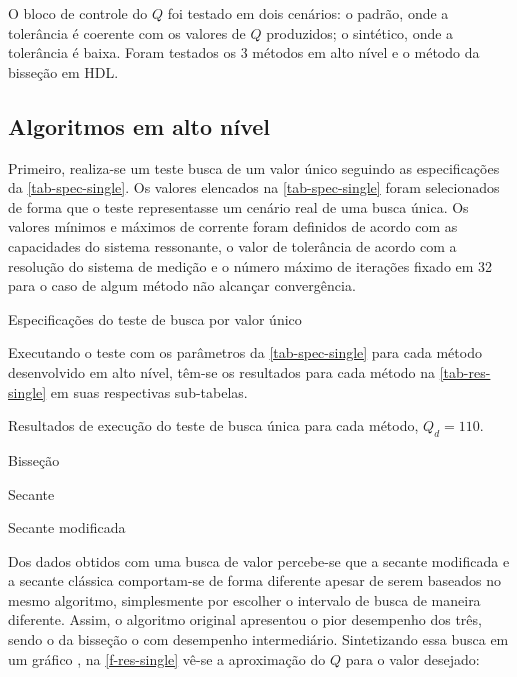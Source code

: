 O bloco de controle do $Q$ foi testado em dois cenários: o padrão, onde a tolerância é coerente com os valores de $Q$ produzidos; o sintético, onde a tolerância é baixa. Foram testados os 3 métodos em alto nível e o método da bisseção em HDL.



\subsection{Algoritmos em alto nível}%
Primeiro, realiza-se um teste busca de um valor único seguindo as especificações da \autoref{tab-spec-single}. Os valores elencados na \autoref{tab-spec-single} foram selecionados de forma que o teste representasse um cenário real de uma busca única. Os valores mínimos e máximos de corrente foram definidos de acordo com as capacidades do sistema ressonante, o valor de tolerância de acordo com a resolução do sistema de medição e o número máximo de iterações fixado em 32 para o caso de algum método não alcançar convergência.%
\begin{table}[H]
    \centering
    \caption{Especificações do teste de busca por valor único}
    
    \label{tab-spec-single}
\end{table}

Executando o teste com os parâmetros da \autoref{tab-spec-single} para cada método desenvolvido em alto nível, têm-se os resultados para cada método na \autoref{tab-res-single} em suas respectivas sub-tabelas.

\begin{table}[H]%
    \centering
    \caption{Resultados de execução do teste de busca única para cada método, $Q_d = 110$.}
    \begin{subtable}[H]{\textwidth}
        \centering
        \caption{Bisseção}
        
    \end{subtable}
    \begin{subtable}[H]{\textwidth}
        \centering
        \caption{Secante}
        
    \end{subtable}
    \begin{subtable}[H]{\textwidth}
        \centering
        \caption{Secante modificada}
        
    \end{subtable}
    \label{tab-res-single}
\end{table}%
Dos dados obtidos com uma busca de valor percebe-se que a secante modificada e a secante clássica comportam-se de forma diferente apesar de serem baseados no mesmo algoritmo, simplesmente por escolher o intervalo de busca de maneira diferente. Assim, o algoritmo original apresentou o pior desempenho dos três, sendo o da bisseção o com desempenho intermediário. Sintetizando essa busca em um gráfico , na \autoref{f-res-single} vê-se a aproximação do $Q$ para o valor desejado:%

